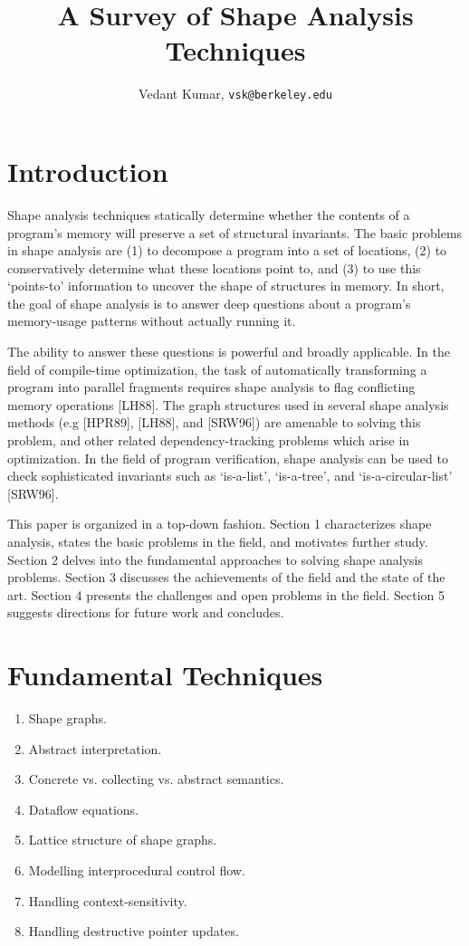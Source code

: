 \documentclass{article}
\title{A Survey of Shape Analysis Techniques}
\author{Vedant Kumar, \texttt{vsk@berkeley.edu}}
\begin{document}
\maketitle

\section{Introduction}

Shape analysis techniques statically determine whether the contents of a
program's memory will preserve a set of structural invariants. The basic
problems in shape analysis are (1) to decompose a program into a set of
locations, (2) to conservatively determine what these locations point to,
and (3) to use this `points-to' information to uncover the shape of
structures in memory. In short, the goal of shape analysis is to answer deep
questions about a program's memory-usage patterns without actually running
it. 

The ability to answer these questions is powerful and broadly applicable. In
the field of compile-time optimization, the task of automatically
transforming a program into parallel fragments requires shape analysis to
flag conflicting memory operations [LH88]. The graph structures used in
several shape analysis methods (e.g [HPR89], [LH88], and [SRW96]) are
amenable to solving this problem, and other related dependency-tracking
problems which arise in optimization. In the field of program verification,
shape analysis can be used to check sophisticated invariants such as
`is-a-list', `is-a-tree', and `is-a-circular-list' [SRW96].

This paper is organized in a top-down fashion. Section 1 characterizes shape
analysis, states the basic problems in the field, and motivates further
study. Section 2 delves into the fundamental approaches to solving shape
analysis problems. Section 3 discusses the achievements of the field and the
state of the art. Section 4 presents the challenges and open problems in the
field. Section 5 suggests directions for future work and concludes.

\section{Fundamental Techniques}

\begin{enumerate}[1.]
    \item Shape graphs.
    \item Abstract interpretation.
    \item Concrete vs. collecting vs. abstract semantics.
    \item Dataflow equations.
    \item Lattice structure of shape graphs.
    \item Modelling interprocedural control flow.
    \item Handling context-sensitivity.
    \item Handling destructive pointer updates.
\end{enumerate}
\end{document}
